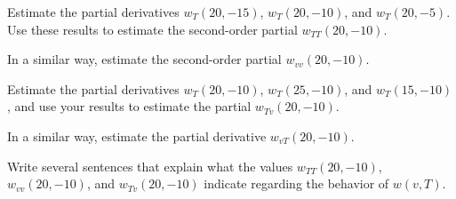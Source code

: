 \begin{activity}

\ba
\item Estimate the partial derivatives $w_{T}(20,-15)$, $w_{T}(20,-10)$, and $w_T(20,-5)$.  Use these results to estimate the second-order partial
  $w_{TT}(20, -10)$.

\item In a similar way, estimate the second-order partial $w_{vv}(20,-10)$.  

\item Estimate the partial derivatives $w_T(20,-10)$, $w_T(25,-10)$, and $w_T(15,-10)$, and use your results to
  estimate the partial $w_{Tv}(20,-10)$.

\item In a similar way, estimate the partial derivative $w_{vT}(20,-10)$.

\item Write several sentences that explain what the values $w_{TT}(20, -10)$,  $w_{vv}(20,-10)$, and $w_{Tv}(20,-10)$ indicate regarding the behavior of $w(v,T)$.

\ea
\end{activity}


